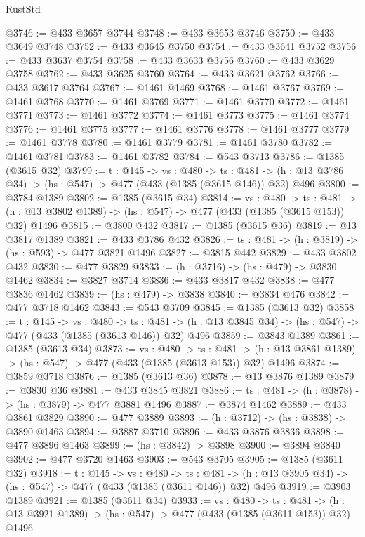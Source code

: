 \begin{lexlean}{RustStd}
\begin{coremodule}
@3746 := @433 @3657 @3744
@3748 := @433 @3653 @3746
@3750 := @433 @3649 @3748
@3752 := @433 @3645 @3750
@3754 := @433 @3641 @3752
@3756 := @433 @3637 @3754
@3758 := @433 @3633 @3756
@3760 := @433 @3629 @3758
@3762 := @433 @3625 @3760
@3764 := @433 @3621 @3762
@3766 := @433 @3617 @3764
@3767 := @1461 @1469
@3768 := @1461 @3767
@3769 := @1461 @3768
@3770 := @1461 @3769
@3771 := @1461 @3770
@3772 := @1461 @3771
@3773 := @1461 @3772
@3774 := @1461 @3773
@3775 := @1461 @3774
@3776 := @1461 @3775
@3777 := @1461 @3776
@3778 := @1461 @3777
@3779 := @1461 @3778
@3780 := @1461 @3779
@3781 := @1461 @3780
@3782 := @1461 @3781
@3783 := @1461 @3782
@3784 := @543 @3713
@3786 := @1385 (@3615 @32)
@3799 := {t : @145} ->
  {vs : @480} ->
  {ts : @481} -> (h : @13 @3786 @34) -> (hs : @547) -> @477 (@433 (@1385 (@3615 @146)) @32) @496
@3800 := @3784 @1389
@3802 := @1385 (@3615 @34)
@3814 := {vs : @480} ->
  {ts : @481} -> (h : @13 @3802 @1389) -> (hs : @547) -> @477 (@433 (@1385 (@3615 @153)) @32) @1496
@3815 := @3800 @432
@3817 := @1385 (@3615 @36)
@3819 := @13 @3817 @1389
@3821 := @433 @3786 @432
@3826 := {ts : @481} -> (h : @3819) -> (hs : @593) -> @477 @3821 @1496
@3827 := @3815 @442
@3829 := @433 @3802 @432
@3830 := @477 @3829
@3833 := (h : @3716) -> (hs : @479) -> @3830 @1462
@3834 := @3827 @3714
@3836 := @433 @3817 @432
@3838 := @477 @3836 @1462
@3839 := (hs : @479) -> @3838
@3840 := @3834 @476
@3842 := @477 @3718 @1462
@3843 := @543 @3709
@3845 := @1385 (@3613 @32)
@3858 := {t : @145} ->
  {vs : @480} ->
  {ts : @481} -> (h : @13 @3845 @34) -> (hs : @547) -> @477 (@433 (@1385 (@3613 @146)) @32) @496
@3859 := @3843 @1389
@3861 := @1385 (@3613 @34)
@3873 := {vs : @480} ->
  {ts : @481} -> (h : @13 @3861 @1389) -> (hs : @547) -> @477 (@433 (@1385 (@3613 @153)) @32) @1496
@3874 := @3859 @3718
@3876 := @1385 (@3613 @36)
@3878 := @13 @3876 @1389
@3879 := @3830 @36
@3881 := @433 @3845 @3821
@3886 := {ts : @481} -> (h : @3878) -> (hs : @3879) -> @477 @3881 @1496
@3887 := @3874 @1462
@3889 := @433 @3861 @3829
@3890 := @477 @3889
@3893 := (h : @3712) -> (hs : @3838) -> @3890 @1463
@3894 := @3887 @3710
@3896 := @433 @3876 @3836
@3898 := @477 @3896 @1463
@3899 := (hs : @3842) -> @3898
@3900 := @3894 @3840
@3902 := @477 @3720 @1463
@3903 := @543 @3705
@3905 := @1385 (@3611 @32)
@3918 := {t : @145} ->
  {vs : @480} ->
  {ts : @481} -> (h : @13 @3905 @34) -> (hs : @547) -> @477 (@433 (@1385 (@3611 @146)) @32) @496
@3919 := @3903 @1389
@3921 := @1385 (@3611 @34)
@3933 := {vs : @480} ->
  {ts : @481} -> (h : @13 @3921 @1389) -> (hs : @547) -> @477 (@433 (@1385 (@3611 @153)) @32) @1496

\end{coremodule}
\end{lexlean}
